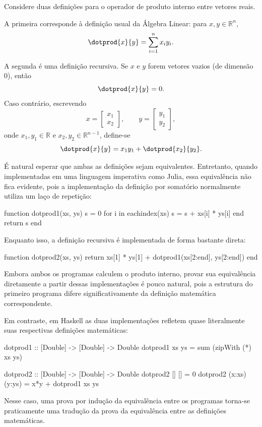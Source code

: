 
Considere duas definições para o operador de produto interno entre vetores reais.

A primeira corresponde à definição usual da Álgebra Linear: para $x, y \in \mathbb{R}^n$,
\[
  \dotprod{x}{y}
  =
  \sum_{i=1}^{n} x_i y_i.
\]

A segunda é uma definição recursiva. Se $x$ e $y$ forem vetores vazios (de dimensão $0$), então
\[
  \dotprod{x}{y} = 0.
\]
Caso contrário, escrevendo
\[
  x
  =
  \begin{bmatrix}
    x_1 \\
    x_2
  \end{bmatrix},
  \qquad
  y
  =
  \begin{bmatrix}
    y_1 \\
    y_2
  \end{bmatrix},
\]
onde $x_1, y_1 \in \mathbb{R}$ e $x_2, y_2 \in \mathbb{R}^{n-1}$, define-se
\[
  \dotprod{x}{y}
  =
  x_1 y_1 + \dotprod{x_2}{y_2}.
\]

É natural esperar que ambas as definições sejam equivalentes. Entretanto, quando implementadas em uma linguagem imperativa como Julia, essa equivalência não fica evidente, pois a implementação da definição por somatório normalmente utiliza um laço de repetição:

\begin{code}
function dotprod1(xs, ys)
    s = 0
    for i in eachindex(xs)
        s = s + xs[i] * ys[i]
    end
    return s
end
\end{code}

Enquanto isso, a definição recursiva é implementada de forma bastante direta:

\begin{code}
function dotprod2(xs, ys)
    return xs[1] * ys[1] + dotprod1(xs[2:end], ys[2:end])
end
\end{code}

Embora ambos os programas calculem o produto interno, provar sua equivalência diretamente a partir dessas implementações é pouco natural, pois a estrutura do primeiro programa difere significativamente da definição matemática correspondente.

Em contraste, em Haskell as duas implementações refletem quase literalmente suas respectivas definições matemáticas:

\begin{code}
dotprod1 :: [Double] -> [Double] -> Double
dotprod1 xs ys = sum (zipWith (*) xs ys)
\end{code}

\begin{code}
dotprod2 :: [Double] -> [Double] -> Double
dotprod2 [] [] = 0
dotprod2 (x:xs) (y:ys) = x*y + dotprod1 xs ys
\end{code}

Nesse caso, uma prova por indução da equivalência entre os programas torna-se praticamente uma tradução da prova da equivalência entre as definições matemáticas.
